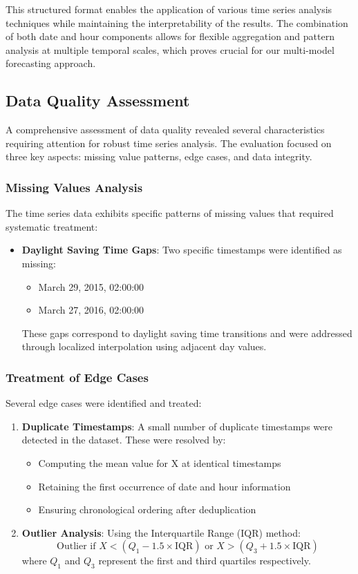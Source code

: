 \documentclass{article}
\begin{document}
This structured format enables the application of various time series analysis techniques while maintaining the interpretability of the results. The combination of both date and hour components allows for flexible aggregation and pattern analysis at multiple temporal scales, which proves crucial for our multi-model forecasting approach.

\subsection{Data Quality Assessment}
A comprehensive assessment of data quality revealed several characteristics requiring attention for robust time series analysis. The evaluation focused on three key aspects: missing value patterns, edge cases, and data integrity.

\subsubsection{Missing Values Analysis}
The time series data exhibits specific patterns of missing values that required systematic treatment:
\begin{itemize}
    \item \textbf{Daylight Saving Time Gaps}: Two specific timestamps were identified as missing:
    \begin{itemize}
        \item March 29, 2015, 02:00:00
        \item March 27, 2016, 02:00:00
    \end{itemize}
    These gaps correspond to daylight saving time transitions and were addressed through localized interpolation using adjacent day values.
\end{itemize}

\subsubsection{Treatment of Edge Cases}
Several edge cases were identified and treated:
\begin{enumerate}
    \item \textbf{Duplicate Timestamps}: A small number of duplicate timestamps were detected in the dataset. These were resolved by:
    \begin{itemize}
        \item Computing the mean value for X at identical timestamps
        \item Retaining the first occurrence of date and hour information
        \item Ensuring chronological ordering after deduplication
    \end{itemize}
    
    \item \textbf{Outlier Analysis}: Using the Interquartile Range (IQR) method:
    \begin{equation}
        \text{Outlier if } X < (Q_1 - 1.5 \times \text{IQR}) \text{ or } X > (Q_3 + 1.5 \times \text{IQR})
    \end{equation}
    where $Q_1$ and $Q_3$ represent the first and third quartiles respectively.
\end{enumerate}
\end{document}
